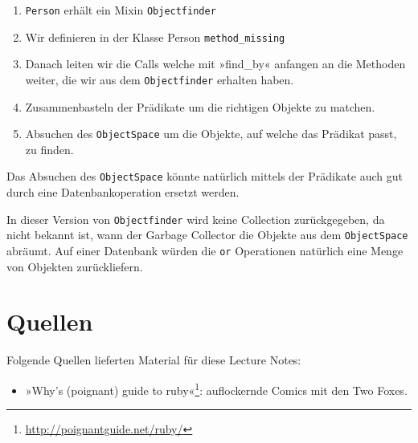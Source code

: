\documentclass[a4book,11pt,twoside]{scrbook}
\begin{document}
\begin{enumerate}
	\item \texttt{Person} erhält ein Mixin \texttt{Objectfinder}
	\item Wir definieren in der Klasse Person \texttt{method\_missing}
	\item Danach leiten wir die Calls welche mit »find\_by« anfangen an die Methoden weiter, die wir aus dem \texttt{Objectfinder} erhalten haben.
	\item Zusammenbasteln der Prädikate um die richtigen Objekte zu matchen.
	\item Absuchen des \texttt{ObjectSpace} um die Objekte, auf welche das Prädikat passt, zu finden.
\end{enumerate}


Das Absuchen des \texttt{ObjectSpace} könnte natürlich mittels der Prädikate auch gut durch eine Datenbankoperation ersetzt werden.

In dieser Version von \texttt{Objectfinder} wird keine Collection zurückgegeben, da nicht bekannt ist, wann der Garbage Collector die Objekte aus dem \texttt{ObjectSpace} abräumt. Auf einer Datenbank würden die \texttt{or} Operationen natürlich eine Menge von Objekten zurückliefern.




\chapter*{Quellen} %
\label{cha:quellen}
Folgende Quellen lieferten Material für diese Lecture Notes:

\begin{itemize}
	\item »Why's (poignant) guide to ruby«\footnote{\url{http://poignantguide.net/ruby/}}: auflockernde Comics mit den Two Foxes.
\end{itemize}
\end{document}
